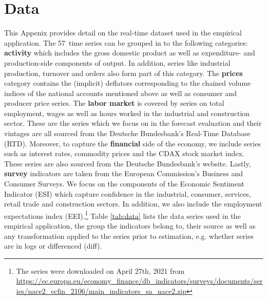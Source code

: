 \documentclass[notitlepage,a4paper,12pt]{article}
\newcommand{\transpose}[1]{{#1}^{\sf{T}}}
\newcommand\NumSeries{57}
\begin{document}


\section{Data}
\label{app:data}
This Appenix provides detail on the real-time dataset used in the empirical application. The \NumSeries\ time series can be grouped in to the following categories: \textbf{activity} which includes the gross domestic product as well as expenditure- and production-side components of output. In addition, series like industrial production, turnover and orders also form part of this category. The \textbf{prices} category contains the (implicit) deflators corresponding to the chained volume indices of the national accounts mentioned above as well as consumer and producer price series. The \textbf{labor market} is covered by series on total employment, wages as well as hours worked in the industrial and construction sector. These are the series which we focus on in the forecast evaluation and their vintages are all sourced from the Deutsche Bundesbank's Real-Time Database (RTD). Moreover, to capture the \textbf{financial} side of the economy, we include series such as interest rates, commodity prices and the CDAX stock market index. These series are also sourced from the Deutsche Bundesbank's website. Lastly, \textbf{survey} indicators are taken from the European Commission's Business and Consumer Surveys. We focus on the components of the Economic Sentiment Indicator (ESI) which capture confidence in the industrial, consumer, services, retail trade and construction sectors. In addition, we also include the employment expectations index (EEI).\footnote{The series were downloaded on April 27th, 2021 from \url{https://ec.europa.eu/economy_finance/db_indicators/surveys/documents/series/nace2_ecfin_2106/main_indicators_sa_nace2.zip}} Table \ref{tab:data} lists the data series used in the empirical application, the group the indicators belong to, their source as well as any transformation applied to the series prior to estimation, e.g. whether series are in logs or differenced (diff). 
\end{document}
